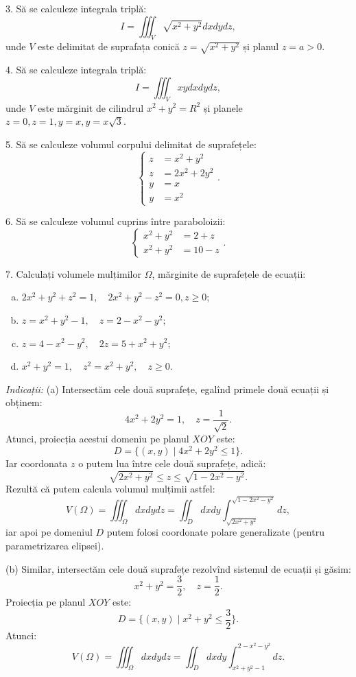 \documentclass[11pt,a4paper]{article}
\theoremstyle{dotless}
\theoremstyle{dotlessdr}
\begin{document}
3. Să se calculeze integrala triplă:
\[
  I = \iiint_V \sqrt{x^2 + y^2} dxdydz,
\]
unde $ V $ este delimitat de suprafața conică $ z = \sqrt{x^2 + y^2} $ și planul
$ z = a > 0 $.

\vspace{1cm}

4. Să se calculeze integrala triplă:
\[
  I = \iiint_V xydxdydz,
\]
unde $ V $ este mărginit de cilindrul $ x^2 + y^2 = R^2 $ și planele
$ z = 0, z = 1, y = x, y = x\sqrt{3} $.

\vspace{1cm}

5. Să se calculeze volumul corpului delimitat de suprafețele:
\[
  \begin{cases}
    z &= x^2 + y^2 \\
    z &= 2x^2 + 2y^2 \\
    y &= x \\
    y &= x^2
  \end{cases}.
\]

\vspace{1cm}

6. Să se calculeze volumul cuprins între paraboloizii:
\[
  \begin{cases}
    x^2 + y^2 &= 2 + z \\
    x^2 + y^2 &= 10 - z
  \end{cases}.
\]

\vspace{1cm}

7. Calculați volumele mulțimilor $ \Omega $, mărginite de suprafețele de ecuații:
\begin{enumerate}[(a)]
\item $ 2x^2 + y^2 + z^2 = 1, \quad 2x^2 + y^2 - z^2 = 0, z \geq 0 $;
\item $ z = x^2 + y^2 - 1, \quad z = 2 - x^2 - y^2 $;
\item $ z = 4 - x^2 - y^2, \quad 2z = 5 + x^2 + y^2 $;
\item $ x^2 + y^2 = 1, \quad z^2 = x^2 + y^2, \quad z \geq 0 $.
\end{enumerate}

\emph{Indicații:} (a) Intersectăm cele două suprafețe, egalînd primele două ecuații și
obținem:
\[
  4x^2 + 2y^2 = 1, \quad z = \frac{1}{\sqrt{2}}.
\]
Atunci, proiecția acestui domeniu pe planul $ XOY $ este:
\[
  D = \{(x, y) \mid 4x^2 + 2y^2 \leq 1 \}.
\]
Iar coordonata $ z $ o putem lua între cele două suprafețe, adică:
\[
  \sqrt{2x^2 + y^2} \leq z \leq \sqrt{1 - 2x^2 - y^2}.
\]
Rezultă că putem calcula volumul mulțimii astfel:
\[
  V(\Omega) = \iiint_\Omega dxdydz = \iint_D dxdy \int_{\sqrt{2x^2 + y^2}}^{\sqrt{1 - 2x^2 - y^2}} dz,
\]
iar apoi pe domeniul $ D $ putem folosi coordonate polare generalizate (pentru parametrizarea
elipsei).

\vspace{1cm}

(b) Similar, intersectăm cele două suprafețe rezolvînd sistemul de ecuații
și găsim:
\[
  x^2 + y^2 = \frac{3}{2}, \quad z = \frac{1}{2}.
\]
Proiecția pe planul $ XOY $ este:
\[
  D = \big\{ (x, y) \mid x^2 + y^2 \leq \frac{3}{2} \big\}.
\]
Atunci:
\[
  V(\Omega) = \iiint_\Omega dxdydz = \iint_D dxdy \int_{x^2 + y^2 - 1}^{2 - x^2 - y^2} dz.
\]
\end{document}
